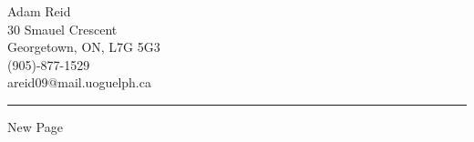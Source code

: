 \documentclass[12pt]{article}
\begin{document}
{\huge Adam Reid}\\
30 Smauel Crescent\\
Georgetown, ON, L7G 5G3\\
(905)-877-1529\\
areid09@mail.uoguelph.ca\\
\noindent\rule{6in}{0.4pt}
\newpage
\pagestyle{normal}
New Page
\end{document}
